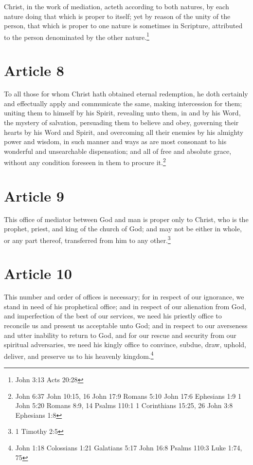 \documentclass[12pt,letterpaper]{book}
\begin{document}
Christ, in the work of mediation, acteth according to both natures, by each nature doing that which is proper to itself; yet by reason of the unity of the person, that which is proper to one nature is sometimes in Scripture, attributed to the person denominated by the other nature.\footnote{John 3:13 Acts 20:28}

\section{Article 8}

To all those for whom Christ hath obtained eternal redemption, he doth certainly and effectually apply and communicate the same, making intercession for them; uniting them to himself by his Spirit, revealing unto them, in and by his Word, the mystery of salvation, persuading them to believe and obey, governing their hearts by his Word and Spirit, and overcoming all their enemies by his almighty power and wisdom, in such manner and ways as are most consonant to his wonderful and unsearchable dispensation; and all of free and absolute grace, without any condition foreseen in them to procure it.\footnote{John 6:37 John 10:15, 16 John 17:9 Romans 5:10 John 17:6 Ephesians 1:9 1 John 5:20 Romans 8:9, 14 Psalms 110:1 1 Corinthians 15:25, 26 John 3:8 Ephesians 1:8}

\section{Article 9}

This office of mediator between God and man is proper only to Christ, who is the prophet, priest, and king of the church of God; and may not be either in whole, or any part thereof, transferred from him to any other.\footnote{1 Timothy 2:5}

\section{Article 10}

This number and order of offices is necessary; for in respect of our ignorance, we stand in need of his prophetical office; and in respect of our alienation from God, and imperfection of the best of our services, we need his priestly office to reconcile us and present us acceptable unto God; and in respect to our averseness and utter inability to return to God, and for our rescue and security from our spiritual adversaries, we need his kingly office to convince, subdue, draw, uphold, deliver, and preserve us to his heavenly kingdom.\footnote{John 1:18 Colossians 1:21 Galatians 5:17 John 16:8 Psalms 110:3 Luke 1:74, 75}
\end{document}

